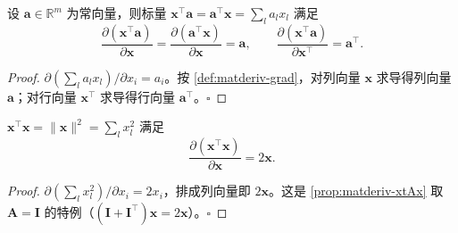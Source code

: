 \begin{proposition}\label{prop:matderiv-xta}
设 $\mathbf{a}\in\mathbb{R}^m$ 为常向量，则标量 $\mathbf{x}^\top\mathbf{a}=\mathbf{a}^\top\mathbf{x}=\sum_l a_l x_l$ 满足
\begin{equation}
  \frac{\partial(\mathbf{x}^\top\mathbf{a})}{\partial\mathbf{x}}=\frac{\partial(\mathbf{a}^\top\mathbf{x})}{\partial\mathbf{x}}=\mathbf{a},
  \qquad
  \frac{\partial(\mathbf{x}^\top\mathbf{a})}{\partial\mathbf{x}^\top}=\mathbf{a}^\top.
  \label{eq:matderiv-xta}
\end{equation}
\end{proposition}
\begin{proof}
$\partial(\sum_l a_l x_l)/\partial x_i=a_i$。按 \cref{def:matderiv-grad}，对列向量 $\mathbf{x}$ 求导得列向量 $\mathbf{a}$；对行向量 $\mathbf{x}^\top$ 求导得行向量 $\mathbf{a}^\top$。\hfill$\square$
\end{proof}

\begin{proposition}\label{prop:matderiv-xtx}
$\mathbf{x}^\top\mathbf{x}=\|\mathbf{x}\|^2=\sum_l x_l^2$ 满足
\begin{equation}
  \frac{\partial(\mathbf{x}^\top\mathbf{x})}{\partial\mathbf{x}}=2\mathbf{x}.
  \label{eq:matderiv-xtx}
\end{equation}
\end{proposition}
\begin{proof}
$\partial(\sum_l x_l^2)/\partial x_i=2x_i$，排成列向量即 $2\mathbf{x}$。这是 \cref{prop:matderiv-xtAx} 取 $\mathbf{A}=\mathbf{I}$ 的特例（$(\mathbf{I}+\mathbf{I}^\top)\mathbf{x}=2\mathbf{x}$）。\hfill$\square$
\end{proof}

